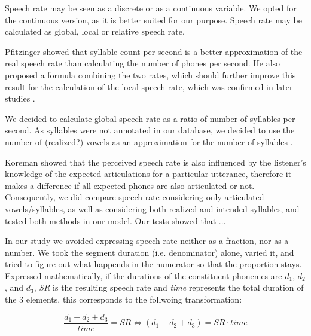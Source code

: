 \documentclass[a4paper]{scrreprt}
\begin{document}
Speech rate may be seen as a discrete or as a continuous variable. We opted for the continuous version, as it is better suited for our purpose.
Speech rate may be calculated as global, local or relative speech rate.

Pfitzinger \cite{Pfitzinger1998} showed that syllable count per second is a better approximation of the real speech rate than calculating the number of phones per second. He also proposed a formula combining the two rates, which should further improve this result for the calculation of the local speech rate, which was confirmed in later studies \cite{Pfitzinger1999}.

We decided to calculate global speech rate as a ratio of number of syllables per second. As syllables were not annotated in our database, we decided to use the number of (realized?) vowels as an approximation for the number of syllables \cite{Yishan_Jiao_2015} \cite{Kohler1995}.

Koreman showed \cite{Koreman_2006} that the perceived speech rate is also influenced by the listener's knowledge of the expected articulations for a particular utterance, therefore it makes a difference if all expected phones are also articulated or not. Consequently, we did compare speech rate considering only articulated vowels/syllables, as well as considering both realized and intended syllables, and tested both methods in our model. Our tests showed that ...

In our study we avoided expressing speech rate neither as a fraction, nor as a number. We took the segment duration (i.e. denominator) alone, varied it, and tried to figure out what happends in the numerator so that the proportion stays. Expressed mathematically, if the durations of the constituent phonemes are $d_1$, $d_2$, and $d_3$, \textit{SR} is the resulting speech rate and \textit{time} represents the total duration of the 3 elements, this corresponds to the follwoing transformation:

$$\frac{d_1+d_2+d_3}{time} = SR \iff (d_1+d_2+d_3)  = SR \cdot time $$
\end{document}

